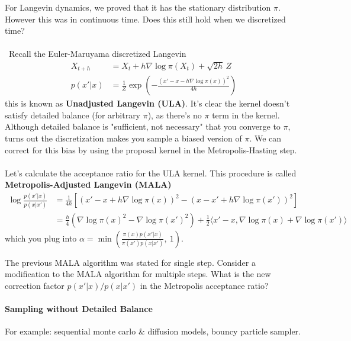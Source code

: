 \begin{eg}
	 For Langevin dynamics, we proved that it has the stationary distribution $\pi$. However this was in continuous time. Does this still hold when we discretized time?
	\\
	\\\
	Recall the Euler-Maruyama discretized Langevin
	\begin{align}
		X_{t+h} & = X_t + h \nabla \log \pi(X_t) + \sqrt{2h} \, Z\\
		p(x' | x) & = \frac{1}{Z} \exp \left( -\frac{(x' - x - h \nabla \log \pi(x))^2}{4h}\right)
	\end{align}
	this is known as \textbf{Unadjusted Langevin (ULA)}. It's clear the kernel doesn't satisfy detailed balance (for arbitrary $\pi$), as there's no $\pi$ term in the kernel. Although detailed balance is "sufficient, not necessary" that you converge to $\pi$, turns out the discretization makes you sample a biased version of $\pi$. We can correct for this bias by using the proposal kernel in the Metropolis-Hasting step.\\
	\\
	Let's calculate the acceptance ratio for the ULA kernel. This procedure is called \textbf{Metropolis-Adjusted Langevin (MALA)}
	\begin{align}
		\log \frac{p(x'| x)}{p(x|x')}  & = \frac{1}{4h} \left[ (x' - x + h \nabla \log \pi(x))^2 - (x - x' + h \nabla \log \pi(x'))^2 \right]\\
		& = \frac{h}{4} (\nabla \log \pi(x)^2 - \nabla \log \pi(x')^2)  + \frac{1}{2}\langle x' - x, \nabla \log \pi(x) + \nabla \log \pi(x')\rangle
	\end{align} 
	which you plug into $\alpha = \min \left( \frac{\pi(x) p(x' | x)}{\pi(x') p(x | x')}, \ 1 \right)$.
\end{eg}
\begin{problem}
	The previous MALA algorithm was stated for single step. Consider a modification to the MALA algorithm for multiple steps. What is the new correction factor $p(x' | x)/p(x|x')$ in the Metropolis acceptance ratio?
\end{problem}

\paragraph{Sampling without Detailed Balance} 
For example: sequential monte carlo \& diffusion models, bouncy particle sampler.


